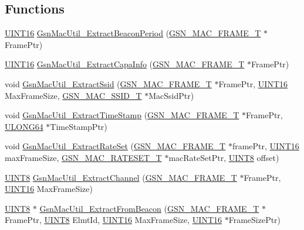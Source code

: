 \subsection*{Functions}
\begin{DoxyCompactItemize}
\item 
\hyperlink{a00660_ga09f1a1fb2293e33483cc8d44aefb1eb1}{UINT16} \hyperlink{a00524_a22c05c594e837ee99ece9e6a2441bf62}{GsnMacUtil\_\-ExtractBeaconPeriod} (\hyperlink{a00116}{GSN\_\-MAC\_\-FRAME\_\-T} $\ast$FramePtr)
\item 
\hyperlink{a00660_ga09f1a1fb2293e33483cc8d44aefb1eb1}{UINT16} \hyperlink{a00524_a92e57c56cd6967b9931876260ec4e46c}{GsnMacUtil\_\-ExtractCapaInfo} (\hyperlink{a00116}{GSN\_\-MAC\_\-FRAME\_\-T} $\ast$FramePtr)
\item 
void \hyperlink{a00524_a9e256983e6d0380f27a546a3173ae7f0}{GsnMacUtil\_\-ExtractSsid} (\hyperlink{a00116}{GSN\_\-MAC\_\-FRAME\_\-T} $\ast$FramePtr, \hyperlink{a00660_ga09f1a1fb2293e33483cc8d44aefb1eb1}{UINT16} MaxFrameSize, \hyperlink{a00417}{GSN\_\-MAC\_\-SSID\_\-T} $\ast$MacSsidPtr)
\item 
void \hyperlink{a00524_a1de4da06175dcc9cea75079099d7b162}{GsnMacUtil\_\-ExtractTimeStamp} (\hyperlink{a00116}{GSN\_\-MAC\_\-FRAME\_\-T} $\ast$FramePtr, \hyperlink{a00660_ga28961430434ccabca6862ea93fe9a15b}{ULONG64} $\ast$TimeStampPtr)
\item 
void \hyperlink{a00524_a35505675bdaa3c4d00983fc1716b6f1c}{GsnMacUtil\_\-ExtractRateSet} (\hyperlink{a00116}{GSN\_\-MAC\_\-FRAME\_\-T} $\ast$framePtr, \hyperlink{a00660_ga09f1a1fb2293e33483cc8d44aefb1eb1}{UINT16} maxFrameSize, \hyperlink{a00125}{GSN\_\-MAC\_\-RATESET\_\-T} $\ast$macRateSetPtr, \hyperlink{a00660_gab27e9918b538ce9d8ca692479b375b6a}{UINT8} offset)
\item 
\hyperlink{a00660_gab27e9918b538ce9d8ca692479b375b6a}{UINT8} \hyperlink{a00524_a975e53784bf40a1620f898769330632d}{GsnMacUtil\_\-ExtractChannel} (\hyperlink{a00116}{GSN\_\-MAC\_\-FRAME\_\-T} $\ast$FramePtr, \hyperlink{a00660_ga09f1a1fb2293e33483cc8d44aefb1eb1}{UINT16} MaxFrameSize)
\item 
\hyperlink{a00660_gab27e9918b538ce9d8ca692479b375b6a}{UINT8} $\ast$ \hyperlink{a00524_abf2bf3e0ade2b534b278fd3d37caf59e}{GsnMacUtil\_\-ExtractFromBeacon} (\hyperlink{a00116}{GSN\_\-MAC\_\-FRAME\_\-T} $\ast$FramePtr, \hyperlink{a00660_gab27e9918b538ce9d8ca692479b375b6a}{UINT8} ElmtId, \hyperlink{a00660_ga09f1a1fb2293e33483cc8d44aefb1eb1}{UINT16} MaxFrameSize, \hyperlink{a00660_ga09f1a1fb2293e33483cc8d44aefb1eb1}{UINT16} $\ast$FrameSizePtr)

\end{DoxyCompactItemize}
